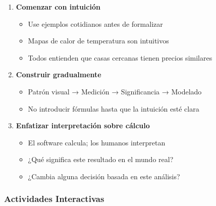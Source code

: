 \documentclass[12pt,a4paper]{article}
\begin{document}
\begin{enumerate}
    \item \textbf{Comenzar con intuición}
    \begin{itemize}
        \item Use ejemplos cotidianos antes de formalizar
        \item Mapas de calor de temperatura son intuitivos
        \item Todos entienden que casas cercanas tienen precios similares
    \end{itemize}
    
    \item \textbf{Construir gradualmente}
    \begin{itemize}
        \item Patrón visual → Medición → Significancia → Modelado
        \item No introducir fórmulas hasta que la intuición esté clara
    \end{itemize}
    
    \item \textbf{Enfatizar interpretación sobre cálculo}
    \begin{itemize}
        \item El software calcula; los humanos interpretan
        \item ¿Qué significa este resultado en el mundo real?
        \item ¿Cambia alguna decisión basada en este análisis?
    \end{itemize}
\end{enumerate}

\subsubsection{Actividades Interactivas}
\end{document}
